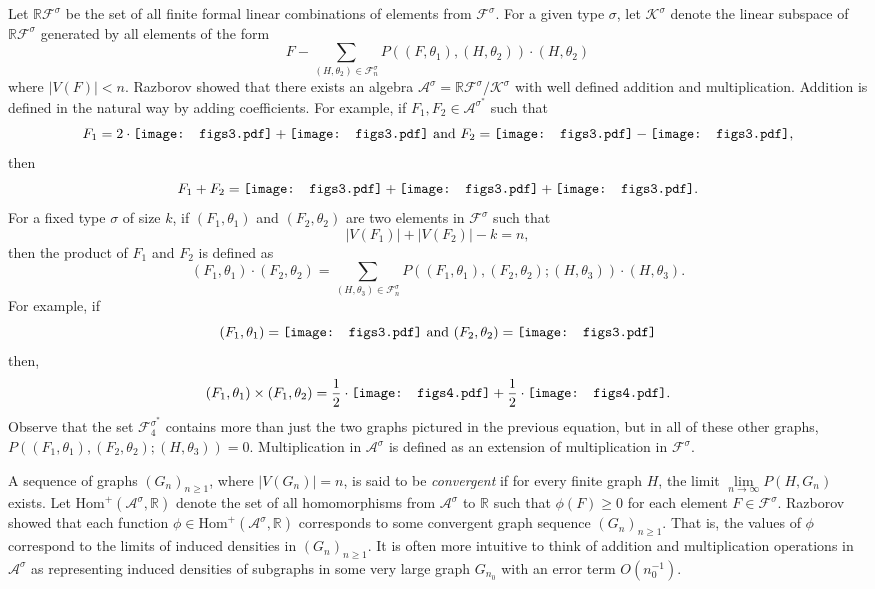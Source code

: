 \documentclass[12pt]{article}
\newcommand{\Hom}{\text{Hom}}
\newcommand{\vc}[1]{\ensuremath{\vcenter{\hbox{#1}}}}
\newcommand{\ftrc}{\vc{\texttt{[image: figs3.pdf]}}}
\newcommand{\ftrd}{\vc{\texttt{[image: figs3.pdf]}}}
\newcommand{\ftre}{\vc{\texttt{[image: figs3.pdf]}}}
\newcommand{\figsfourlabelone}{\vc{\texttt{[image: figs4.pdf]}}}
\newcommand{\figsfourlabeltwo}{\vc{\texttt{[image: figs4.pdf]}}}
\begin{document}
Let $\mathbb{R}\mathcal{F}^{\sigma}$ be the set of all finite formal linear combinations of elements from $\mathcal{F}^{\sigma}$. For a given type $\sigma$, let $\mathcal{K^{\sigma}}$ denote the linear subspace of $\mathbb{R}\mathcal{F^{\sigma}}$ generated by all elements of the form 
\[ 
F - \sum\limits_{(H,\theta_2) \in \mathcal{F}_n^{\sigma}} P((F,\theta_1),(H,\theta_2)) \cdot (H,\theta_2) 
\]
where $|V(F)| < n$. Razborov showed that there exists an algebra $\mathcal{A}^{\sigma} = \mathbb{R}\mathcal{F}^{\sigma}/\mathcal{K}^{\sigma}$ with well defined addition and multiplication. Addition is defined in the natural way by adding coefficients. For example, if $F_1,F_2 \in \mathcal{A}^{\sigma^*}$ such that
\[ F_1 = 2 \cdot \ftrd + \ftre \text{ and } F_2 = \ftrc - \ftrd,\]
then
\[ F_1 + F_2 = \ftrc + \ftrd + \ftre.\]
For a fixed type $\sigma$ of size $k$, if $(F_1,\theta_1)$ and $(F_2,\theta_2)$ are two elements in $\mathcal{F}^{\sigma}$ such that 
\[|V(F_1)| + |V(F_2)| - k = n,\] then the product of $F_1$ and $F_2$ is defined as 
\[ (F_1,\theta_1) \cdot (F_2,\theta_2) = \sum\limits_{(H,\theta_3) \in \mathcal{F}^{\sigma}_n} P((F_1,\theta_1),(F_2,\theta_2);(H,\theta_3)) \cdot (H,\theta_3).\]
For example, if
\[(F_1,\theta_1) = \ftrc \text { and } (F_2,\theta_2) = \ftrd \]
then, 
\[ (F_1,\theta_1) \times (F_1,\theta_2) = \frac{1}{2} \cdot \figsfourlabelone + \frac{1}{2} \cdot \figsfourlabeltwo.\]
Observe that the set $\mathcal{F}_4^{\sigma^*}$ contains more than just the two graphs pictured in the previous equation, but in all of these other graphs, $P((F_1,\theta_1),(F_2,\theta_2);(H,\theta_3)) = 0$. Multiplication in $\mathcal{A}^{\sigma}$ is defined as an extension of multiplication in $\mathcal{F}^{\sigma}$. 


A sequence of graphs $(G_n)_{n \geq 1}$, where $|V(G_n)| = n$, is said to be \emph{convergent} if for every finite graph $H$, the limit $\lim\limits_{n \to \infty} P(H,G_n)$ exists. Let $\Hom^+(\mathcal{A}^{\sigma},\mathbb{R})$ denote the set of all homomorphisms from $\mathcal{A}^{\sigma}$ to $\mathbb{R}$ such that $\phi(F) \geq 0$ for each element $F \in \mathcal{F}^{\sigma}$. Razborov showed that each function $\phi \in \Hom^+(\mathcal{A}^{\sigma},\mathbb{R})$ corresponds to some convergent graph sequence $(G_n)_{n \geq 1}$. That is, the values of $\phi$ correspond to the limits of induced densities in $(G_n)_{n \geq 1}$. It is often more intuitive to think of addition and multiplication operations in $\mathcal{A}^{\sigma}$ as representing induced densities of subgraphs in some very large graph $G_{n_0}$ with an error term $O(n_0^{-1})$. 
\end{document}
